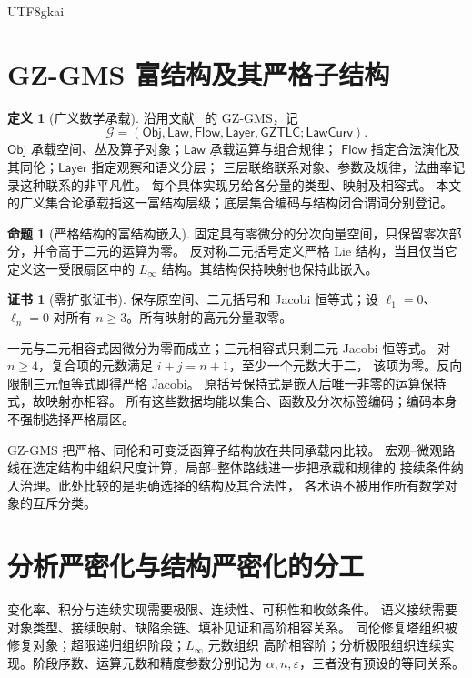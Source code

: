 \documentclass[12pt]{report}
\makeatletter
\theoremstyle{definition}
\newtheorem{definition}{定义}[chapter]
\newtheorem{proposition}{命题}[chapter]
\newtheorem{Certificate}{证书}[chapter]
\renewenvironment{proof}[1][\proofname]{\par
  \pushQED{\qed}\normalfont
  \topsep6\p@\@plus6\p@\relax
  \trivlist
  \item[\hskip\labelsep\normalfont #1\@addpunct{.}]\ignorespaces
}{
  \popQED\endtrivlist\@endpefalse
}
\makeatother
\begin{document}
\begin{CJK*}{UTF8}{gkai}
\section{GZ-GMS 富结构及其严格子结构}
\begin{definition}[广义数学承载]
沿用文献~\cite{pure} 的 GZ-GMS，记
\[
\mathcal G=
(\mathsf{Obj},\mathsf{Law},\mathsf{Flow},\mathsf{Layer},
 \mathsf{GZTLC};\mathsf{LawCurv}).
\]
\(\mathsf{Obj}\) 承载空间、丛及算子对象；\(\mathsf{Law}\) 承载运算与组合规律；
\(\mathsf{Flow}\) 指定合法演化及其同伦；\(\mathsf{Layer}\) 指定观察和语义分层；
三层联络联系对象、参数及规律，法曲率记录这种联系的非平凡性。
每个具体实现另给各分量的类型、映射及相容式。
本文的广义集合论承载指这一富结构层级；底层集合编码与结构闭合谓词分别登记。
\end{definition}
\begin{proposition}[严格结构的富结构嵌入]
\label{prop:gms-embedding}
固定具有零微分的分次向量空间，只保留零次部分，并令高于二元的运算为零。
反对称二元括号定义严格 Lie 结构，当且仅当它定义这一受限扇区中的
\(L_\infty\) 结构。其结构保持映射也保持此嵌入。
\end{proposition}
\begin{Certificate}[零扩张证书]
保存原空间、二元括号和 Jacobi 恒等式；设 \(\ell_1=0\)、
\(\ell_n=0\) 对所有 \(n\ge3\)。所有映射的高元分量取零。
\end{Certificate}
\begin{proof}
一元与二元相容式因微分为零而成立；三元相容式只剩二元 Jacobi 恒等式。
对 \(n\ge4\)，复合项的元数满足 \(i+j=n+1\)，至少一个元数大于二，
该项为零。反向限制三元恒等式即得严格 Jacobi。
原括号保持式是嵌入后唯一非零的运算保持式，故映射亦相容。
所有这些数据均能以集合、函数及分次标签编码；编码本身不强制选择严格扇区。
\end{proof}
GZ-GMS 把严格、同伦和可变泛函算子结构放在共同承载内比较。
宏观--微观路线在选定结构中组织尺度计算，局部--整体路线进一步把承载和规律的
接续条件纳入治理。此处比较的是明确选择的结构及其合法性，
各术语不被用作所有数学对象的互斥分类。

\section{分析严密化与结构严密化的分工}
变化率、积分与连续实现需要极限、连续性、可积性和收敛条件。
语义接续需要对象类型、接续映射、缺陷余链、填补见证和高阶相容关系。
同伦修复塔组织被修复对象；超限递归组织阶段；\(L_\infty\) 元数组织
高阶相容阶；分析极限组织连续实现。阶段序数、运算元数和精度参数分别记为
\(\alpha,n,\varepsilon\)，三者没有预设的等同关系。


\end{CJK*}
\end{document}
